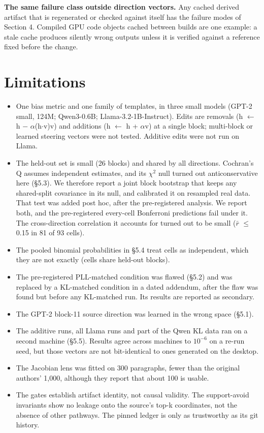 \documentclass[
  10pt,
]{article}
\providecommand{\tightlist}{%
  \setlength{\itemsep}{0pt}\setlength{\parskip}{0pt}}
\begin{document}
\textbf{The same failure class outside direction vectors.} Any cached
derived artifact that is regenerated or checked against itself has the
failure modes of Section 4. Compiled GPU code objects cached between
builds are one example: a stale cache produces silently wrong outputs
unless it is verified against a reference fixed before the change.

\section{Limitations}\label{limitations}

\begin{itemize}
\tightlist
\item
  One bias metric and one family of templates, in three small models
  (GPT-2 small, 124M; Qwen3-0.6B; Llama-3.2-1B-Instruct). Edits are
  removals (h $\leftarrow$ h $-$ $\alpha$(h$\cdot$v)v) and additions (h $\leftarrow$ h + $\alpha$v) at a single
  block; multi-block or learned steering vectors were not tested.
  Additive edits were not run on Llama.
\item
  The held-out set is small (26 blocks) and shared by all directions.
  Cochran's Q assumes independent estimates, and its $\chi^2$ null turned out
  anticonservative here (§5.3). We therefore report a joint block
  bootstrap that keeps any shared-split covariance in its null, and
  calibrated it on resampled real data. That test was added post hoc,
  after the pre-registered analysis. We report both, and the
  pre-registered every-cell Bonferroni predictions fail under it. The
  cross-direction correlation it accounts for turned out to be small
  (\textbar $\bar{r}$\textbar{} $\le$ 0.15 in 81 of 93 cells).
\item
  The pooled binomial probabilities in §5.4 treat cells as independent,
  which they are not exactly (cells share held-out blocks).
\item
  The pre-registered PLL-matched condition was flawed (§5.2) and was
  replaced by a KL-matched condition in a dated addendum, after the flaw
  was found but before any KL-matched run. Its results are reported as
  secondary.
\item
  The GPT-2 block-11 source direction was learned in the wrong space
  (§5.1).
\item
  The additive runs, all Llama runs and part of the Qwen KL data ran on
  a second machine (§5.5). Results agree across machines to $10^{-6}$ on a
  re-run seed, but those vectors are not bit-identical to ones generated
  on the desktop.
\item
  The Jacobian lens was fitted on 300 paragraphs, fewer than the
  original authors' 1,000, although they report that about 100 is
  usable.
\item
  The gates establish artifact identity, not causal validity. The
  support-avoid invariants show no leakage onto the source's top-k
  coordinates, not the absence of other pathways. The pinned ledger is
  only as trustworthy as its git history.
\end{itemize}
\end{document}
